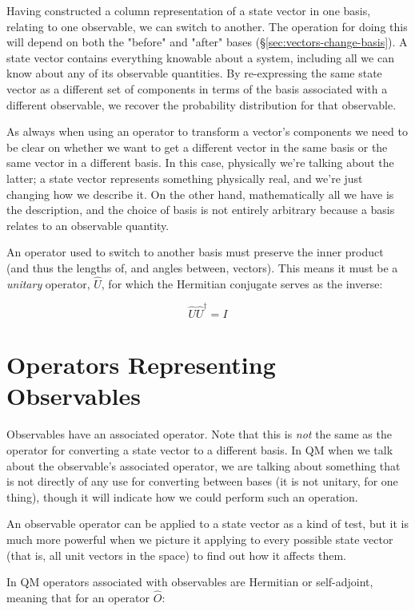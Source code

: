 Having constructed a column representation of a state vector in one basis, relating to one observable, we can switch to another. The operation for doing this will depend on both the "before" and "after" bases (§\ref{sec:vectors-change-basis}). A state vector contains everything knowable about a system, including all we can know about any of its observable quantities. By re-expressing the same state vector as a different set of components in terms of the basis associated with a different observable, we recover the probability distribution for that observable.

As always when using an operator to transform a vector's components we need to be clear on whether we want to get a different vector in the same basis or the same vector in a different basis. In this case, physically we're talking about the latter; a state vector represents something physically real, and we're just changing how we describe it. On the other hand, mathematically all we have is the description, and the choice of basis is not entirely arbitrary because a basis relates to an observable quantity.

An operator used to switch to another basis must preserve the inner product (and thus the lengths of, and angles between, vectors). This means it must be a \textit{unitary} operator, $\hat{U}$, for which the Hermitian conjugate serves as the inverse:

$$\hat{U} \hat{U}^\dagger = I$$

\section{Operators Representing Observables} \label{sec:qm-operators1}

Observables have an associated operator. Note that this is \textit{not} the same as the operator for converting a state vector to a different basis. In QM when we talk about the observable's associated operator, we are talking about something that is not directly of any use for converting between bases (it is not unitary, for one thing), though it will indicate how we could perform such an operation.

An observable operator can be applied to a state vector as a kind of test, but it is much more powerful when we picture it applying to every possible state vector (that is, all unit vectors in the space) to find out how it affects them.

In QM operators associated with observables are Hermitian or self-adjoint, meaning that for an operator $\hat{O}$:


